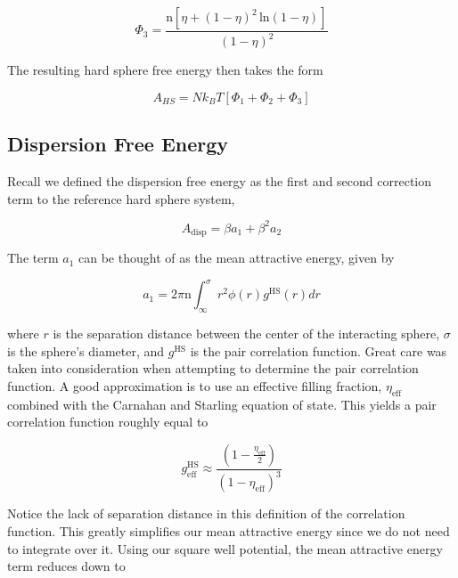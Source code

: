 \begin{equation}
\Phi_3 = \frac{\text{n}[\eta + (1-\eta)^2 \, \text{ln}(1-\eta)]}{(1-\eta)^2}
\end{equation} 

The resulting hard sphere free energy then takes the form

\begin{equation}
A_{HS} = N k_B T [ \Phi_1 + \Phi_2 + \Phi_3 ]
\end{equation}

















\subsection{Dispersion Free Energy}

Recall we defined the dispersion free energy as the first and second correction term to the reference hard sphere system,

\begin{equation}
A_{\text{disp}} = \beta a_1 + \beta^2 a_2
\end{equation}


The term $a_1$ can be thought of as the mean attractive energy, given by

\begin{equation}
a_1 = 2 \pi \text{n} \int^{\sigma}_{\infty} r^2 \phi(r) g^{\text{HS}}(r) dr
\end{equation}

where $r$ is the separation distance between the center of the interacting sphere, $\sigma$ is the sphere's diameter, and $g^{\text{HS}}$ is the pair correlation function.  Great care was taken into consideration when attempting to determine the pair correlation function.  A good approximation is to use an effective filling fraction, $\eta_{\text{eff}}$ combined with the Carnahan and Starling equation of state.  This yields a pair correlation function roughly equal to

\begin{equation}
g^{\text{HS}}_{\text{eff}} \approx \frac{\left( 1 - \frac{\eta_{\text{eff}}}{2} \right)}{(1-\eta_{\text{eff}})^3}
\end{equation}

Notice the lack of separation distance in this definition of the correlation function.  This greatly simplifies our mean attractive energy since we do not need to integrate over it.  Using our square well potential, the mean attractive energy term reduces down to

